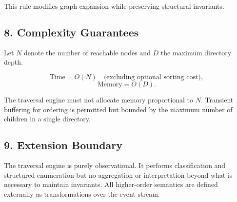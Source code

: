 This rule modifies graph expansion while preserving structural invariants.

\subsection*{8. Complexity Guarantees}

Let $N$ denote the number of reachable nodes and $D$ the maximum directory depth.

\[
\text{Time} = O(N) \quad \text{(excluding optional sorting cost)},
\]
\[
\text{Memory} = O(D).
\]

The traversal engine must not allocate memory proportional to $N$. 
Transient buffering for ordering is permitted but bounded by the maximum 
number of children in a single directory.

\subsection*{9. Extension Boundary}

The traversal engine is purely observational. It performs classification 
and structured enumeration but no aggregation or interpretation beyond 
what is necessary to maintain invariants. All higher-order semantics 
are defined externally as transformations over the event stream.